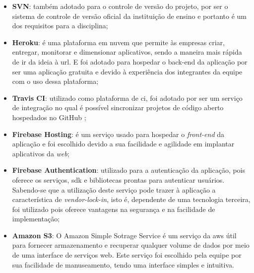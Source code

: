 \begin{itemize}
\item{\textbf{SVN}}: também adotado para o controle de versão do projeto, por ser o sistema de controle de versão oficial da instituição de ensino e portanto é um dos requisitos para a disciplina;

\item{\textbf{Heroku}}: é uma plataforma em nuvem que permite às empresas criar, entregar, monitorar e dimensionar aplicativos, sendo a maneira mais rápida de ir da ideia à \ac{url}. E foi adotado para hospedar o back-end da aplicação por ser uma aplicação gratuita e devido à experiência dos integrantes da equipe com o uso dessa plataforma;

\item{\textbf{Travis CI}}: utilizado como plataforma de \ac{ci}, foi adotado por ser um serviço de integração no qual é possível sincronizar projetos de código aberto hospedados no GitHub \cite{travis:2021};

\item{\textbf{Firebase Hosting}}: é um serviço usado para hospedar o  \textit{\gls{front-end}} da aplicação e foi escolhido devido a sua facilidade e agilidade em implantar aplicativos da \textit{\gls{web}};

\item{\textbf{Firebase Authentication}}: utilizado para a autenticação da aplicação, pois oferece os serviços, \ac{sdk} e bibliotecas prontas para autenticar usuários. Sabendo-se que a utilização deste serviço pode trazer à aplicação a característica de \textit{\gls{vendor-lock-in}}, isto é, dependente de uma tecnologia terceira, foi utilizado pois oferece vantagens na segurança e na facilidade de implementação;  

\item{\textbf{Amazon S3}}: O Amazon Simple Sotrage Service é um serviço da \ac{aws} útil para fornecer armazenamento e recuperar qualquer volume de dados por meio de uma interface de serviços web. Este serviço foi escolhido pela equipe por sua facilidade de manuseamento, tendo uma interface simples e intuitiva.

\end{itemize}